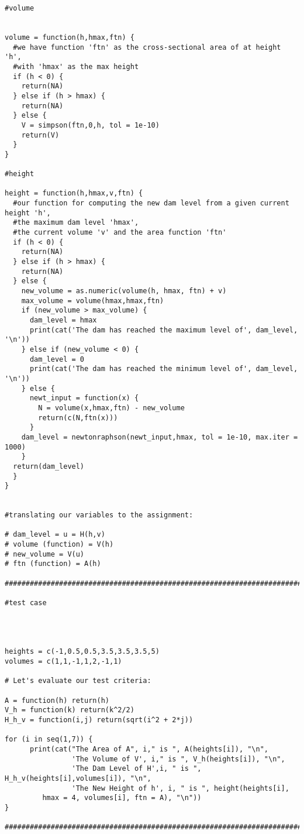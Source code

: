 \documentclass[a4paper, 11pt, oneside]{article}
\begin{document}
\begin{verbatim}
#volume
  

volume = function(h,hmax,ftn) {
  #we have function 'ftn' as the cross-sectional area of at height 'h', 
  #with 'hmax' as the max height
  if (h < 0) {
    return(NA)
  } else if (h > hmax) {
    return(NA)
  } else {
    V = simpson(ftn,0,h, tol = 1e-10)
    return(V)
  }
}

#height
  
height = function(h,hmax,v,ftn) {
  #our function for computing the new dam level from a given current height 'h', 
  #the maximum dam level 'hmax',
  #the current volume 'v' and the area function 'ftn'
  if (h < 0) {
    return(NA)
  } else if (h > hmax) {
    return(NA)
  } else {
    new_volume = as.numeric(volume(h, hmax, ftn) + v)
    max_volume = volume(hmax,hmax,ftn)
    if (new_volume > max_volume) {
      dam_level = hmax
      print(cat('The dam has reached the maximum level of', dam_level, '\n'))
    } else if (new_volume < 0) {
      dam_level = 0
      print(cat('The dam has reached the minimum level of', dam_level, '\n'))
    } else { 
      newt_input = function(x) {
        N = volume(x,hmax,ftn) - new_volume
        return(c(N,ftn(x)))
      }
    dam_level = newtonraphson(newt_input,hmax, tol = 1e-10, max.iter = 1000)
    }
  return(dam_level)
  }
}


#translating our variables to the assignment:

# dam_level = u = H(h,v)
# volume (function) = V(h)
# new_volume = V(u)
# ftn (function) = A(h)

######################################################################################################

#test case




heights = c(-1,0.5,0.5,3.5,3.5,3.5,5)
volumes = c(1,1,-1,1,2,-1,1)

# Let's evaluate our test criteria:

A = function(h) return(h)
V_h = function(k) return(k^2/2)
H_h_v = function(i,j) return(sqrt(i^2 + 2*j))

for (i in seq(1,7)) {
      print(cat("The Area of A", i," is ", A(heights[i]), "\n", 
                'The Volume of V', i," is ", V_h(heights[i]), "\n",
                'The Dam Level of H',i, " is ", H_h_v(heights[i],volumes[i]), "\n",
                'The New Height of h', i, " is ", height(heights[i],
		 hmax = 4, volumes[i], ftn = A), "\n"))
}

######################################################################################################



\end{verbatim}
\end{document}
